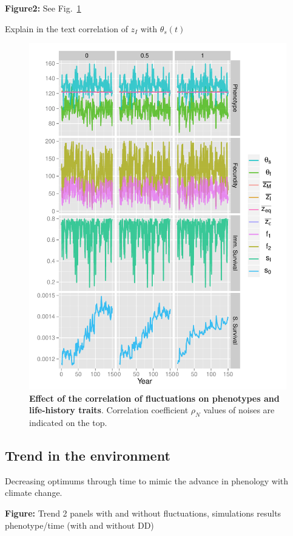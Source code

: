 \textbf{Figure2:} See Fig.~\ref{fig:corr}

Explain in the text correlation of $z_{I}$ with $\theta_{s}(t)$

\begin{figure}[ht!]
	\centering
	\includegraphics[scale=1]{Figures/PhenoLHTwithCorr.pdf}
	\caption{\textbf{Effect of the correlation of fluctuations on phenotypes and life-history traits}. Correlation coefficient $\rho_{N}$ values of noises are indicated on the top.}
	\label{fig:corr}
\end{figure}

\subsection*{Trend in the environment}

Decreasing optimums through time to mimic the advance in phenology with climate change.

\textbf{Figure:} Trend 2 panels with and without fluctuations, simulations results phenotype/time (with and without DD)


